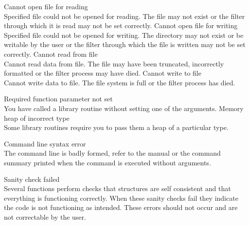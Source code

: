 \begin{itemize}
 Cannot open file for reading \\
        Specified file could not be opened for reading.  The file may not
        exist or the filter through which it is read may not be set correctly.
 Cannot open file for writing \\
        Specified file could not be opened for writing.  The directory may
        not exist or be writable by the user or the filter through which the
        file is written may not be set correctly.
 Cannot read from file \\
        Cannot read data from file.  The file may have been truncated,  
        incorrectly formatted or the filter process may have died.
 Cannot write to file \\
        Cannot write data to file.  The file system is full or the filter
        process has died.

 Required function parameter not set \\
        You have called a library routine without setting one of the arguments.
 Memory heap of incorrect type \\
        Some library routines require you to pass them a heap of a particular
        type.

 Command line syntax error \\
        The command line is badly formed, refer to the manual or the command
        summary printed when the command is executed without arguments.

 Sanity check failed \\
        Several functions perform checks that structures are self consistent
        and that everything is functioning correctly.  When these sanity checks
        fail they indicate the code is not functioning as intended.  These
        errors should not occur and are not correctable by the user.
\end{itemize}


